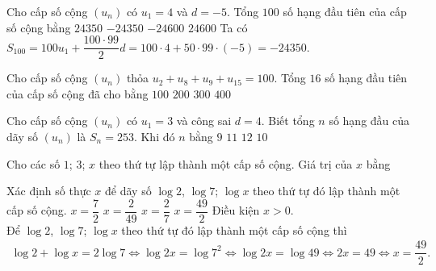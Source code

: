 \begin{ex}%
    Cho cấp số cộng $(u_n)$ có $u_1=4$ và $d=-5$. Tổng $100$ số hạng đầu tiên của cấp số cộng bằng
    \choice
    {$24350$}
    {\True $-24350$}
    {$-24600$}
    {$24600$}
    \loigiai
    {
        Ta có $S_{100}=100u_1+\dfrac{100\cdot 99}{2}d =100\cdot 4+50\cdot 99\cdot (-5)=-24350$.
    }
\end{ex}
\begin{ex}%
    Cho cấp số cộng $(u_n)$ thỏa $u_2+u_8+u_9+u_{15}=100$. Tổng $16$ số hạng đầu tiên của cấp số cộng đã cho bằng
    \choice
    {$100$}
    {$200$}
    {$300$}
    {\True $400$}
\end{ex}
\begin{ex}%
    Cho cấp số cộng $(u_n)$ có $u_1=3$ và công sai $d=4$. Biết tổng $n$ số hạng đầu của dãy số $(u_n)$ là $S_n=253$. Khi đó $n$ bằng
    \choice
    {$9$}
    {\True $11$}
    {$12$}
    {$10$}
\end{ex}
\begin{ex}%
Cho các số $1$; $3$; $x$ theo thứ tự lập thành một cấp số cộng. Giá trị của $x$ bằng
\end{ex}
\begin{ex}%
    Xác định số thực $x$ để dãy số $\log 2$, $\log 7$; $\log x$ theo thứ tự đó lập thành một cấp số cộng.
    \choice
    {$x=\dfrac{7}{2}$}
    {$x=\dfrac{2}{49}$}
    {$x=\dfrac{2}{7}$}
    {\True $x=\dfrac{49}{2}$}
    \loigiai
    {
        Điều kiện $x>0$.\\
        Để $\log 2$, $\log 7$; $\log x$ theo thứ tự đó lập thành một cấp số cộng thì
        \begin{align*}
            \log 2+\log x=2\log 7\Leftrightarrow \log 2x=\log 7^2\Leftrightarrow \log 2x=\log 49\Leftrightarrow 2x=49\Leftrightarrow x=\dfrac{49}{2}.
        \end{align*}
    }
\end{ex}
